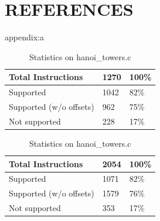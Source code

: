 \documentclass[10pt,twocolumn]{article}
\begin{document}
\section{REFERENCES}
\begingroup
\renewcommand{\section}[2]{}

\small
\endgroup

\appendix
\clearpage
\section{Appendix}
\label{appendix:a}
\begin{table}[!ht]
  \centering
  
  \medskip

  \begin{tabular}{l|l|l}
    \textbf{Total Instructions} & \textbf{1270} & \textbf{100\%} \\ \hline
    Supported                   & 1042          & 82\%           \\ \hline
    Supported (w/o offsets)     & 962           & 75\%           \\ \hline
    Not supported               & 228           & 17\%          
  \end{tabular}%
  \label{result-fibo}
  \caption{Statistics on fibonacci.c}

  \bigskip

  
  \medskip

  \begin{tabular}{l|l|l}
    \textbf{Total Instructions} & \textbf{2054} & \textbf{100\%} \\ \hline
    Supported                   & 1071          & 82\%           \\ \hline
    Supported (w/o offsets)     & 1579          & 76\%           \\ \hline
    Not supported               & 353           & 17\%          
  \end{tabular}%
  \label{result-hanoi}
  \caption{Statistics on hanoi\_towers.c}
\end{table}


\end{document}
